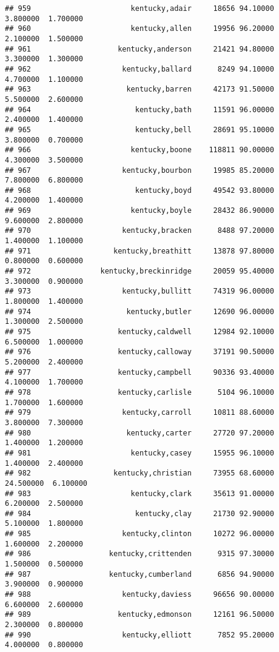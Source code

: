 \documentclass[
]{article}
\begin{document}
\begin{verbatim}
## 959                       kentucky,adair     18656 94.10000  3.800000  1.700000
## 960                       kentucky,allen     19956 96.20000  2.100000  1.500000
## 961                    kentucky,anderson     21421 94.80000  3.300000  1.300000
## 962                     kentucky,ballard      8249 94.10000  4.700000  1.100000
## 963                      kentucky,barren     42173 91.50000  5.500000  2.600000
## 964                        kentucky,bath     11591 96.00000  2.400000  1.400000
## 965                        kentucky,bell     28691 95.10000  3.800000  0.700000
## 966                       kentucky,boone    118811 90.00000  4.300000  3.500000
## 967                     kentucky,bourbon     19985 85.20000  7.800000  6.800000
## 968                        kentucky,boyd     49542 93.80000  4.200000  1.400000
## 969                       kentucky,boyle     28432 86.90000  9.600000  2.800000
## 970                     kentucky,bracken      8488 97.20000  1.400000  1.100000
## 971                   kentucky,breathitt     13878 97.80000  0.800000  0.600000
## 972                kentucky,breckinridge     20059 95.40000  3.300000  0.900000
## 973                     kentucky,bullitt     74319 96.00000  1.800000  1.400000
## 974                      kentucky,butler     12690 96.00000  1.300000  2.500000
## 975                    kentucky,caldwell     12984 92.10000  6.500000  1.000000
## 976                    kentucky,calloway     37191 90.50000  5.200000  2.400000
## 977                    kentucky,campbell     90336 93.40000  4.100000  1.700000
## 978                    kentucky,carlisle      5104 96.10000  1.700000  1.600000
## 979                     kentucky,carroll     10811 88.60000  3.800000  7.300000
## 980                      kentucky,carter     27720 97.20000  1.400000  1.200000
## 981                       kentucky,casey     15955 96.10000  1.400000  2.400000
## 982                   kentucky,christian     73955 68.60000 24.500000  6.100000
## 983                       kentucky,clark     35613 91.00000  6.200000  2.500000
## 984                        kentucky,clay     21730 92.90000  5.100000  1.800000
## 985                     kentucky,clinton     10272 96.00000  1.600000  2.200000
## 986                  kentucky,crittenden      9315 97.30000  1.500000  0.500000
## 987                  kentucky,cumberland      6856 94.90000  3.900000  0.900000
## 988                     kentucky,daviess     96656 90.00000  6.600000  2.600000
## 989                    kentucky,edmonson     12161 96.50000  2.300000  0.800000
## 990                     kentucky,elliott      7852 95.20000  4.000000  0.800000

\end{verbatim}
\end{document}
